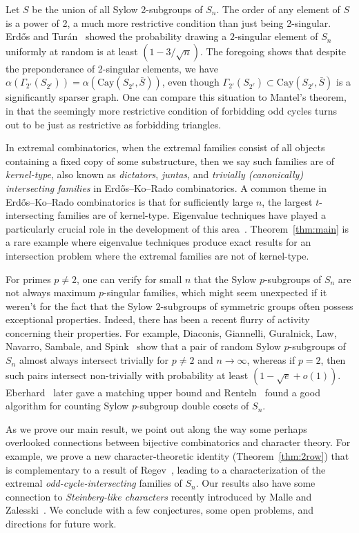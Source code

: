\documentclass[12pt]{article}
\begin{document}
Let $S$ be the union of all Sylow 2-subgroups of $S_n$. The order of any element of $S$ is a power of 2, a much more restrictive condition than just being 2-singular. Erd\H{o}s and Tur\'an~\cite{ErdosT67b} showed the probability drawing a $2$-singular element of $S_n$ uniformly at random is at least $(1 - 3/\sqrt{n})$.
The foregoing shows that despite the preponderance of 2-singular elements, we have
$\alpha(\Gamma_{2'}(S_{2^\ell})) = \alpha(\mathrm{Cay}(S_{2^\ell}, \bar{S}))$, even though $\Gamma_{2'}(S_{2^\ell}) \subset \mathrm{Cay}(S_{2^\ell}, \bar{S})$ is a significantly sparser graph. One can compare this situation to Mantel's theorem, in that the seemingly more restrictive condition of forbidding odd cycles turns out to be just as restrictive as forbidding triangles. 

In extremal combinatorics, when the extremal families consist of all objects containing a fixed copy of some substructure, then we say such families are of \emph{kernel-type}, also known as \emph{dictators}, \emph{juntas}, and \emph{trivially (canonically) intersecting families} in Erd\H{o}s--Ko--Rado combinatorics. A common theme in Erd\H{o}s--Ko--Rado combinatorics is that for sufficiently large $n$, the largest $t$-intersecting families are of kernel-type. Eigenvalue techniques have played a particularly crucial role in the development of this area~\cite{GodsilMeagher}. Theorem~\ref{thm:main} is a rare example where eigenvalue techniques produce exact results for an intersection problem where the extremal families are not of kernel-type.


For primes $p \neq 2$, one can verify for small $n$ that the Sylow $p$-subgroups of $S_n$ are not always maximum $p$-singular families, which might seem unexpected if it weren't for the fact that the Sylow $2$-subgroups of symmetric groups often possess exceptional properties. Indeed, there has been a recent flurry of activity concerning their properties. For example, Diaconis, Giannelli, Guralnick, Law, Navarro, Sambale, and Spink~\cite{DiaconisGGLNSS25} show that a pair of random Sylow $p$-subgroups of $S_n$ almost always intersect trivially for $p \neq 2$ and $n \rightarrow \infty$, whereas if $p = 2$, then such pairs intersect non-trivially with probability at least $(1-\sqrt{e}+o(1))$. Eberhard~\cite{Eberhard25} later gave a matching upper bound and Renteln~\cite{Renteln25} found a good algorithm for counting Sylow $p$-subgroup double cosets of $S_n$. 

As we prove our main result, we point out along the way some perhaps overlooked connections between bijective combinatorics and character theory. For example, we prove a new character-theoretic identity (Theorem~\ref{thm:2row}) that is complementary to a result of Regev~\cite[Proposition 1.1]{Regev13}, leading to a characterization of the extremal \emph{odd-cycle-intersecting} families of $S_n$. Our results also have some connection to \emph{Steinberg-like characters} recently introduced by Malle and Zalesski~\cite{MalleZ20}. We conclude with a few conjectures, some open problems, and directions for future work.
\end{document}
